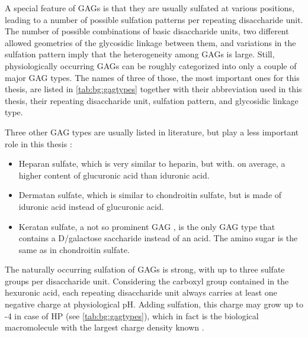 A special feature of GAGs is that they are usually sulfated at various
positions, leading to a number of possible sulfation patterns per repeating
disaccharide unit. The number of possible combinations of basic disaccharide
units, two different allowed geometries of the glycosidic linkage between them,
and variations in the sulfation pattern imply that the heterogeneity among GAGs
is large. Still, physiologically occurring GAGs can be roughly categorized into
only a couple of major GAG types. The names of three of those, the most
important ones for this thesis, are listed in \cref{tab:bg:gagtypes} together
with their abbreviation used in this thesis, their repeating disaccharide unit,
sulfation pattern, and glycosidic linkage type.

Three other GAG types are usually listed in literature, but play a less
important role in this thesis \cite{gandhi_structure_2008}:

\begin{itemize}
\item Heparan sulfate, which is very similar to heparin, but with. on average, a
higher content of glucuronic acid than iduronic acid.
\item Dermatan sulfate, which is similar to chondroitin sulfate, but is made
of iduronic acid instead of glucuronic acid.
\item Keratan sulfate, a not so prominent GAG \cite{gandhi_structure_2008}, is
the only GAG type that contains a D\-/galactose saccharide instead of an
acid. The amino sugar is the same as in chondroitin sulfate.
\end{itemize}



The naturally occurring sulfation of GAGs is strong, with up to three sulfate
groups per disaccharide unit. Considering the carboxyl group contained in the
hexuronic acid, each repeating disaccharide unit always carries at least one
negative charge at physiological pH. Adding sulfation, this charge may grow up
to -4 in case of HP (see \cref{tab:bg:gagtypes}), which in fact is the
biological macromolecule with the largest charge density known
\cite{capila_linhardt_hep_prot_2002}.


